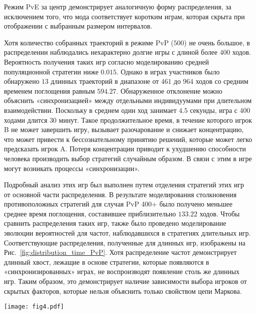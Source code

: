 Режим PvE за центр демонстрирует аналогичную форму распределения, за исключением того, что мода соответствует коротким играм, которая скрыта при отображении с выбранным размером интервалов.

Хотя количество собранных траекторий в режиме PvP ($500$) не очень большое, в распределении наблюдались нехарактерно долгие игры с длиной более $400$ ходов. 
Вероятность получения таких игр согласно моделированию средней популяционной стратегии ниже $0.015$. 
Однако в играх участников было обнаружено $13$ длинных траекторий в диапазоне от $461$ до $964$ ходов со средним временем поглощения равным $594.27$. 
Обнаруженное отклонение можно объяснить «синхронизацией» между отдельными индивидуумами при длительном взаимодействии. 
Поскольку в среднем один ход занимает $4.5$ секунды, игра с $400$ ходами длится $30$ минут. 
Такое продолжительное время, в течение которого игрок B не может завершить игру, вызывает разочарование и снижает концентрацию, 
что может привести к бессознательному принятию решений, которые может легко предсказать игрок A. 
Потеря концентрации приводит к ухудшению способности человека производить выбор стратегий случайным образом. 
В связи с этим в игре могут возникать процессы «синхронизации».

Подробный анализ этих игр был выполнен путем отделения стратегий этих игр от основной части распределения. 
В результате моделирования столкновения противоположных стратегий для случая PvP 400+ было получено меньшее среднее время поглощения, составившее приблизительно $133.22$ ходов. 
Чтобы сравнить распределения таких игр, также было проведено моделирование эволюции вероятностей для частот, наблюдавшихся в стратегиях длительных игр. 
Соответствующие распределения, полученные для длинных игр, изображены на Рис.~\cref{fig:distribution_time_PvP}. Хотя распределение частот демонстрирует длинный хвост, 
лежащие в основе стратегии, которые появляются в «синхронизированных» играх, не воспроизводят появление столь же длинных игр. 
Таким образом, это демонстрирует наличие зависимости выбора игроков от скрытых факторов, которые нельзя объяснить только свойством цепи Маркова.


\begin{figure*}[t]
    \centering
    \texttt{[image: fig4.pdf]}
    \caption{
        Распределение времени поглощения для режима PvP (желтая гистограмма и фиолетовая линия) 
        по сравнению с моделированием частот направлений движения (зеленая линия) и частот стратегий (синяя линия), 
        наблюдаемых в длительных играх (более $400$ ходов). Частоты направлений движения для каждого состояния, полученные в 
        экспериментальных длинных играх, использовались для моделирования эволюции вероятностей найти фишку в узлах решетки. 
        Стратегии обоих игроков A и B в PvP с длиной ходов более $400$ использовались отдельно при моделировании.
    }  
    \label{fig:distribution_time_PvP}

\end{figure*}

